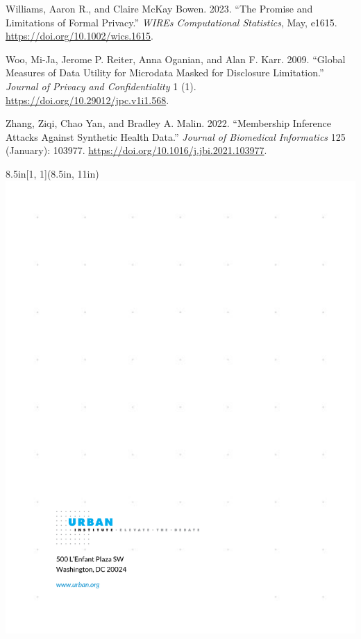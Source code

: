 \documentclass[
]{urban-formatting}
\newlength{\cslhangindent}
\newlength{\cslentryspacingunit} %
\newenvironment{CSLReferences}[2] %
 {%
  \setlength{\parindent}{0pt}
  \ifodd #1
  \let\oldpar\par
  \def\par{\hangindent=\cslhangindent\oldpar}
  \fi
  \setlength{\parskip}{#2\cslentryspacingunit}
 }%
 {}
\begin{document}
\begin{CSLReferences}{1}{0}
\leavevmode{}%
Williams, Aaron R., and Claire McKay Bowen. 2023. {``The Promise and
Limitations of Formal Privacy.''} \emph{WIREs Computational Statistics},
May, e1615. \url{https://doi.org/10.1002/wics.1615}.

\leavevmode{}%
Woo, Mi-Ja, Jerome P. Reiter, Anna Oganian, and Alan F. Karr. 2009.
{``Global Measures of Data Utility for Microdata Masked for Disclosure
Limitation.''} \emph{Journal of Privacy and Confidentiality} 1 (1).
\url{https://doi.org/10.29012/jpc.v1i1.568}.

\leavevmode{}%
Zhang, Ziqi, Chao Yan, and Bradley A. Malin. 2022. {``Membership
Inference Attacks Against Synthetic Health Data.''} \emph{Journal of
Biomedical Informatics} 125 (January): 103977.
\url{https://doi.org/10.1016/j.jbi.2021.103977}.

\end{CSLReferences}



\newpage
\thispagestyle{empty}

\begin{textblock*}{8.5in}[1, 1](8.5in, 11in)
    \noindent\includegraphics[width=\paperwidth,height=\paperheight]{images/back.pdf}
\end{textblock*}
\end{document}

